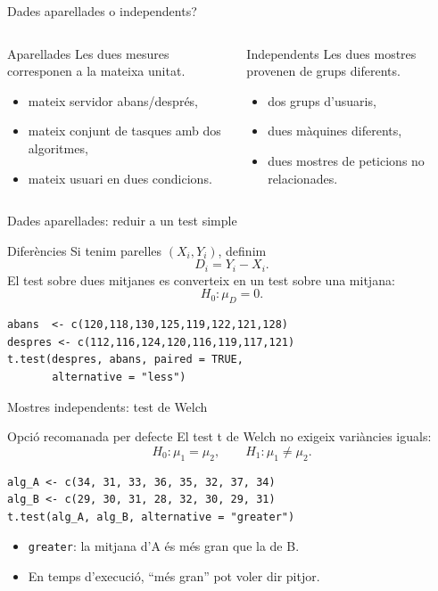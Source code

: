 \documentclass[10pt,aspectratio=169]{beamer}
\begin{document}
\begin{frame}[fragile]{Dades aparellades o independents?}
\begin{columns}[T]
\begin{block}{Aparellades}
Les dues mesures corresponen a la mateixa unitat.
\begin{itemize}
  \item mateix servidor abans/després,
  \item mateix conjunt de tasques amb dos algoritmes,
  \item mateix usuari en dues condicions.
\end{itemize}
\end{block}
\begin{block}{Independents}
Les dues mostres provenen de grups diferents.
\begin{itemize}
  \item dos grups d'usuaris,
  \item dues màquines diferents,
  \item dues mostres de peticions no relacionades.
\end{itemize}
\end{block}
\end{columns}
\end{frame}

\begin{frame}[fragile]{Dades aparellades: reduir a un test simple}
\begin{block}{Diferències}
Si tenim parelles $(X_i,Y_i)$, definim
\[
D_i=Y_i-X_i.
\]
El test sobre dues mitjanes es converteix en un test sobre una mitjana:
\[
H_0:\mu_D=0.
\]
\end{block}
\begin{lstlisting}
abans  <- c(120,118,130,125,119,122,121,128)
despres <- c(112,116,124,120,116,119,117,121)
t.test(despres, abans, paired = TRUE,
       alternative = "less")
\end{lstlisting}
\end{frame}

\begin{frame}[fragile]{Mostres independents: test de Welch}
\begin{block}{Opció recomanada per defecte}
El test t de Welch no exigeix variàncies iguals:
\[
H_0:\mu_1=\mu_2,\qquad H_1:\mu_1\ne\mu_2.
\]
\end{block}
\begin{lstlisting}
alg_A <- c(34, 31, 33, 36, 35, 32, 37, 34)
alg_B <- c(29, 30, 31, 28, 32, 30, 29, 31)
t.test(alg_A, alg_B, alternative = "greater")
\end{lstlisting}
\begin{itemize}
  \item \texttt{greater}: la mitjana d'A és més gran que la de B.
  \item En temps d'execució, ``més gran'' pot voler dir pitjor.
\end{itemize}
\end{frame}
\end{document}
